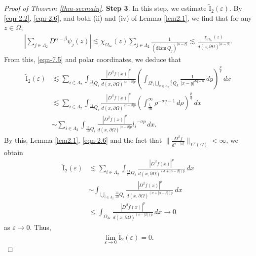 \documentclass[11pt,twoside]{article}
\def\Qi{\frac{11}{10}Q_i}
\def\Qkk{\frac{6}{5}Q_k}
\def\az{\alpha}
\def\bz{\beta}
\def\blz{\Lambda}
\def\boz{{\Omega}}
\def\sz{\sigma}
\def\vez{\varepsilon}
\def\pa{\partial}                %
\def\huae{\varepsilon}
\def\bozthreee{\boz_{3\huae}}
\theoremstyle{mylem}
\theoremstyle{definition}
\numberwithin{equation}{section}
\begin{document}
\begin{proof}[Proof of Theorem \ref{thm-secmain}]
{\bf Step 3}. In this step, we estimate $\tilde{\mathrm{I}}_2(\vez)$. By \eqref{eqn-2.2}, \eqref{eqn-2.6}, and both (ii) and (iv) of Lemma \ref{lem2.1}, we find that for any $z\in\boz$,
\begin{align}\label{eqn-xiutwo}
\left| \sum_{j\in\Lambda_2}D^{\az-\bz}\psi_j(z) \right|\lesssim \chi_{\boz_{3\vez}}(z)\sum_{j\in\Lambda_2}\frac{1}{(\mathrm{diam\,}Q_j)^{|\az-\bz|}}\lesssim \frac{\chi_{\boz_{3\vez}}(z)}{d(z,\pa\boz)^{|\az-\bz|}}.
\end{align}
From this, \eqref{eqn-7.5} and polar coordinates, we deduce that
\begin{align*}
\tilde{\mathrm{I}}_2(\vez)
&\lesssim \sum_{i \in \Lambda_2} \int_{\Qi} \frac{| D^{\bz}f(x) |^p}{d(x,\pa\boz)^{|\az-\bz|p}} \left( \int_{\boz \setminus \bigcup_{k \in \blz_2} \Qkk} \frac{1}{|x - y|^{\sz q + n}}\,dy \right)^{\frac{p}{q}}\,dx\\
&\lesssim \sum_{i \in \Lambda_2} \int_{\Qi} \frac{| D^{\bz}f(x) |^p}{d(x,\pa\boz)^{|\az-\bz|p}} \left( \int_{\frac{l_i}{20}}^\infty \rho^{-\sz q - 1}\,d\rho \right)^{\frac{p}{q}}\,dx \\
&\sim \sum_{i \in \Lambda_2} \int_{\Qi} \frac{| D^{\bz}f(x) |^p}{d(x,\pa\boz)^{|\az-\bz|p}} {l_i}^{-\sz p}\,dx.
\end{align*}
By this, Lemma \ref{lem2.1}, \eqref{eqn-2.6} and 
the fact
that $\|\frac{D^\beta f}{d^{s-|\beta|}}\|_{L^p(\Omega)}<\infty$, we obtain
\begin{align*}
\tilde{\mathrm{I}}_2(\vez)
&\lesssim \sum_{i \in \Lambda_2} \int_{\Qi} \frac{|D^\beta f(x)|^p}{d(x, \partial\Omega)^{(\sz+|\az-\bz|) p}}\,dx\\
&\sim \int_{\bigcup_{i \in \Lambda_2} \Qi} \frac{|D^\beta f(x)|^p}{d(x, \partial\Omega)^{(\sz+|\az-\bz|) p}}\,dx \nonumber \\
&\leq \int_{\bozthreee}  \frac{|D^\beta f(x)|^p}{d(x, \partial\Omega)^{(s-|\bz|) p}}\,dx \to 0
\end{align*}
as $\varepsilon \to 0.$ Thus,
\begin{equation}\label{eqn-4.25}
\lim_{\varepsilon \to 0} \tilde{\mathrm{I}}_2(\vez) = 0.
\end{equation}


\end{proof}
\end{document}
